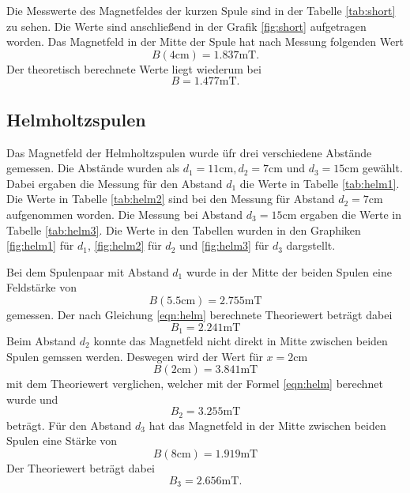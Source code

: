 Die Messwerte des Magnetfeldes der kurzen Spule sind in der Tabelle \ref{tab:short} zu sehen.
Die Werte sind anschließend in der Grafik \ref{fig:short} aufgetragen worden.
Das Magnetfeld in der Mitte der Spule hat nach Messung folgenden Wert
\begin{equation*}
  B(4\si{\centi\meter})=1.837\si{\milli\tesla} .
\end{equation*}
Der theoretisch berechnete Werte liegt wiederum bei
\begin{equation*}
  B = 1.477\si{\milli\tesla}.
\end{equation*}

\FloatBarrier

\subsection{Helmholtzspulen}

Das Magnetfeld der Helmholtzspulen wurde üfr drei verschiedene Abstände gemessen.
Die Abstände wurden als $d_1=11\si{\centi\metre}, d_2=7\si{\centi\metre}$ und $d_3= 15 \si{\centi\metre}$ gewählt.
Dabei ergaben die Messung für den Abstand $d_1$ die Werte in Tabelle \ref{tab:helm1}.
Die Werte in Tabelle \ref{tab:helm2} sind bei den Messung für Abstand $d_2=7\si{\centi\metre}$ aufgenommen worden.
Die Messung bei Abstand $d_3=15\si{\centi\metre}$ ergaben die Werte in Tabelle \ref{tab:helm3}.
Die Werte in den Tabellen wurden in den Graphiken \ref{fig:helm1} für $d_1$, \ref{fig:helm2} für $d_2$ und \ref{fig:helm3} für $d_3$ dargstellt.

Bei dem Spulenpaar mit Abstand $d_1$ wurde in der Mitte der beiden Spulen eine Feldstärke von 
\begin{equation*}
  B(5.5\si{\centi\meter}) = 2.755 \si{\milli\tesla}
\end{equation*}
gemessen.
Der nach Gleichung \eqref{eqn:helm} berechnete Theoriewert beträgt dabei
\begin{equation*}
  B_1= 2.241 \si{\milli\tesla}
\end{equation*}
Beim Abstand $d_2$ konnte das Magnetfeld nicht direkt in Mitte zwischen beiden Spulen gemssen werden.
Deswegen wird der Wert für $x=2 \si{\centi\meter}$
\begin{equation*}
  B(2\si{\centi\meter})= 3.841 \si{\milli\tesla}
\end{equation*}
mit dem Theoriewert verglichen, welcher mit der Formel \eqref{eqn:helm} berechnet wurde und 
\begin{equation*}
  B_2 = 3.255 \si{\milli\tesla}
\end{equation*}
beträgt.
Für den Abstand $d_3$ hat das Magnetfeld in der Mitte zwischen beiden Spulen eine Stärke von 
\begin{equation*}
  B(8\si{\centi\meter})= 1.919\si{\milli\tesla}
\end{equation*}
Der Theoriewert beträgt dabei 
\begin{equation*}
  B_3=2.656 \si{\milli\tesla}.
\end{equation*}

